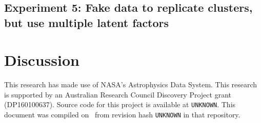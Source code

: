\documentclass{aastex61}
\newcommand{\githash}{UNKNOWN}
\newcommand{\giturl}{UNKNOWN}}
\begin{document}
\subsection{Experiment 5: Fake data to replicate clusters, but use multiple latent factors}


\section{Discussion}
\label{sec:discussion}


\acknowledgments

This research has made use of NASA's Astrophysics Data System.
This research is supported by an Australian Research Council Discovery Project
grant (DP160100637). 
Source code for this project is available at \texttt{\giturl}. This document
was compiled on \gitdate\ from revision hash \texttt{\githash} in that
repository. 


\end{document}
